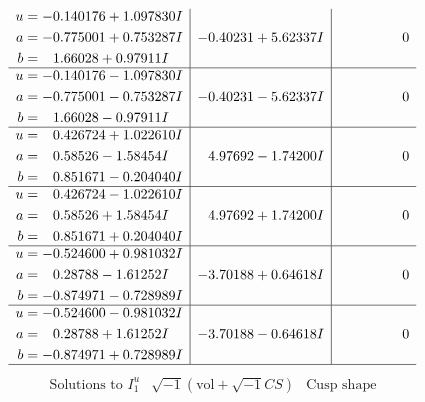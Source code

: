 \documentclass[1p]{elsarticle_modified}
\theoremstyle{definition}
\newcommand{\I}{\sqrt{-1}}
\begin{document}
$$\begin{array}{c|c|c}
\begin{aligned}
u &= -0.140176 + 1.097830 I \\
a &= -0.775001 + 0.753287 I \\
b &= \phantom{-}1.66028 + 0.97911 I\end{aligned}
 & -0.40231 + 5.62337 I & \phantom{-0.000000 } 0 \\ \hline\begin{aligned}
u &= -0.140176 - 1.097830 I \\
a &= -0.775001 - 0.753287 I \\
b &= \phantom{-}1.66028 - 0.97911 I\end{aligned}
 & -0.40231 - 5.62337 I & \phantom{-0.000000 } 0 \\ \hline\begin{aligned}
u &= \phantom{-}0.426724 + 1.022610 I \\
a &= \phantom{-}0.58526 - 1.58454 I \\
b &= \phantom{-}0.851671 - 0.204040 I\end{aligned}
 & \phantom{-}4.97692 - 1.74200 I & \phantom{-0.000000 } 0 \\ \hline\begin{aligned}
u &= \phantom{-}0.426724 - 1.022610 I \\
a &= \phantom{-}0.58526 + 1.58454 I \\
b &= \phantom{-}0.851671 + 0.204040 I\end{aligned}
 & \phantom{-}4.97692 + 1.74200 I & \phantom{-0.000000 } 0 \\ \hline\begin{aligned}
u &= -0.524600 + 0.981032 I \\
a &= \phantom{-}0.28788 - 1.61252 I \\
b &= -0.874971 - 0.728989 I\end{aligned}
 & -3.70188 + 0.64618 I & \phantom{-0.000000 } 0 \\ \hline\begin{aligned}
u &= -0.524600 - 0.981032 I \\
a &= \phantom{-}0.28788 + 1.61252 I \\
b &= -0.874971 + 0.728989 I\end{aligned}
 & -3.70188 - 0.64618 I & \phantom{-0.000000 } 0\\
 \hline 
 \end{array}$$\newpage$$\begin{array}{c|c|c}  
\text{Solutions to }I^u_{1}& \I (\text{vol} + \sqrt{-1}CS) & \text{Cusp shape}\\
 \hline 
\begin{aligned}

\end{aligned}
\end{array}$$
\end{document}
